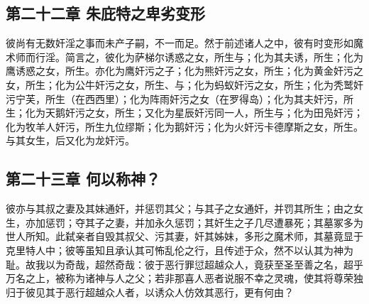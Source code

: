 \subsection{第二十二章 朱庇特之卑劣变形}

彼尚有无数奸淫之事而未产子嗣，不一而足。然于前述诸人之中，彼有时变形如魔术师而行淫。简言之，彼化为萨梯尔诱惑之女，所生与；化为其夫诱，所生；化为鹰诱惑之女，所生。亦化为鹰奸污之子；化为熊奸污之女，所生；化为黄金奸污之女，所生；化为公牛奸污之女，所生、与；化为蚂蚁奸污之女，所生；化为秃鹫奸污宁芙，所生（在西西里）；化为阵雨奸污之女（在罗得岛）；化为其夫奸污，所生；化为天鹅奸污之女，所生；又化为星辰奸污同一人，所生与；化为田凫奸污；化为牧羊人奸污，所生九位缪斯；化为鹅奸污；化为火奸污卡德摩斯之女，所生。与其女生，后又化为龙奸污。\par


\subsection{第二十三章 何以称神？}

彼亦与其叔之妻及其妹通奸，并惩罚其父；与其子之女通奸，并罚其所生；由之女生，亦加惩罚；夺其子之妻，并加永久惩罚；其奸生之子几尽遭暴死；其墓冢多为世人所知。此弑亲者自毁其叔父、污其妻，奸其姊妹，多形之魔术师，其墓竟显于克里特人中；彼等虽知且承认其可怖乱伦之行，且传述于众，然不以认其为神为耻。故我以为奇哉，超然奇哉：彼于恶行罪愆超越众人，竟获至圣至善之名，超乎万名之上，被称为诸神与人之父；若非那喜人恶者说服不幸之灵魂，使其将尊荣独归于彼见其于恶行超越众人者，以诱众人仿效其恶行，更有何由？\par

